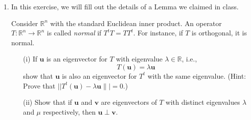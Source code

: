 \documentclass[12pt]{article}
\theoremstyle{plain}
\theoremstyle{definition}
\theoremstyle{remark}
\newcommand{\R}{\mathbb{R}}
\newcommand{\lra}{\longrightarrow}
\begin{document}
\begin{enumerate}
{\it Hint:} Since $S_0^2 = S_1^2 = 1$,  the only nontrivial elements 
of the group generated by $S_0$ and $S_1$ are the products where $S_0$ and $S_1$ alternate.  
Find all distinct elements of this form and determine their products. 

\item In this exercise, we will fill out the details of a Lemma we claimed in class.

Consider $\R^n$ with the standard Euclidean inner product. An operator $T:\R^n \lra \R^n$ is called \emph{normal} if $T^tT=TT^t$. For instance, if $T$ is orthogonal, it is normal.
\begin{enumerate}
\item[(i)] If $\mathbf{u}$ is an eigenvector for $T$ with eigenvalue $\lambda\in \R$, i.e.,
\[T(\mathbf{u})=\lambda \mathbf{u}\]
show that $\mathbf{u}$ is also an eigenvector for $T^t$ with the same eigenvalue. (Hint: Prove that $||T^t(\mathbf{u})-\lambda \mathbf{u} \||=0$.)
\item[(ii)] Show that if $\mathbf{u}$ and $\mathbf{v}$ are eigenvectors of $T$ with distinct eigenvalues $\lambda$ and $\mu$ respectively, then $\mathbf{u}\perp \mathbf{v}$.
\end{enumerate} 

\end{enumerate}
\end{document}
